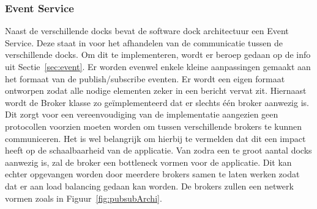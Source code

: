 \subsubsection{Event Service}
Naast de verschillende docks bevat de software dock architectuur een Event Service.
Deze staat in voor het afhandelen van de communicatie tussen de verschillende docks.
Om dit te implementeren, wordt er beroep gedaan op de info uit Sectie~\ref{sec:event}.
Er worden evenwel enkele kleine aanpassingen gemaakt aan het formaat van de publish/subscribe eventen.
Er wordt een eigen formaat ontworpen zodat alle nodige elementen zeker in een bericht vervat zit.
Hiernaast wordt de Broker klasse zo geïmplementeerd dat er slechts één broker aanwezig is.
Dit zorgt voor een vereenvoudiging van de implementatie aangezien geen protocollen voorzien moeten worden om tussen verschillende brokers te kunnen communiceren.
Het is wel belangrijk om hierbij te vermelden dat dit een impact heeft op de schaalbaarheid van de applicatie.
Van zodra een te groot aantal docks aanwezig is, zal de broker een bottleneck vormen voor de applicatie.
Dit kan echter opgevangen worden door meerdere brokers samen te laten werken zodat dat er aan load balancing gedaan kan worden.
De brokers zullen een netwerk vormen zoals in Figuur~\ref{fig:pubsubArchi}.

